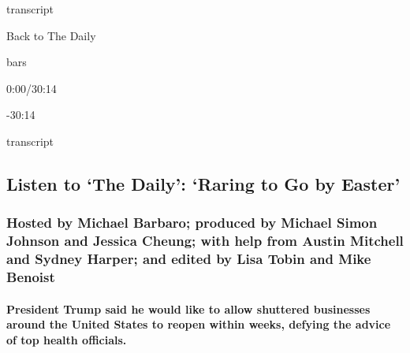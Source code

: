 transcript

Back to The Daily

bars

0:00/30:14

-30:14

transcript

\hypertarget{listen-to-the-daily-raring-to-go-by-easter-1}{%
\subsection{Listen to `The Daily': `Raring to Go by
Easter'}\label{listen-to-the-daily-raring-to-go-by-easter-1}}

\hypertarget{hosted-by-michael-barbaro-produced-by-michael-simon-johnson-and-jessica-cheung-with-help-from-austin-mitchell-and-sydney-harper-and-edited-by-lisa-tobin-and-mike-benoist}{%
\subsubsection{Hosted by Michael Barbaro; produced by Michael Simon
Johnson and Jessica Cheung; with help from Austin Mitchell and Sydney
Harper; and edited by Lisa Tobin and Mike
Benoist}\label{hosted-by-michael-barbaro-produced-by-michael-simon-johnson-and-jessica-cheung-with-help-from-austin-mitchell-and-sydney-harper-and-edited-by-lisa-tobin-and-mike-benoist}}

\hypertarget{president-trump-said-he-would-like-to-allow-shuttered-businesses-around-the-united-states-to-reopen-within-weeks-defying-the-advice-of-top-health-officials}{%
\paragraph{President Trump said he would like to allow shuttered
businesses around the United States to reopen within weeks, defying the
advice of top health
officials.}\label{president-trump-said-he-would-like-to-allow-shuttered-businesses-around-the-united-states-to-reopen-within-weeks-defying-the-advice-of-top-health-officials}}

